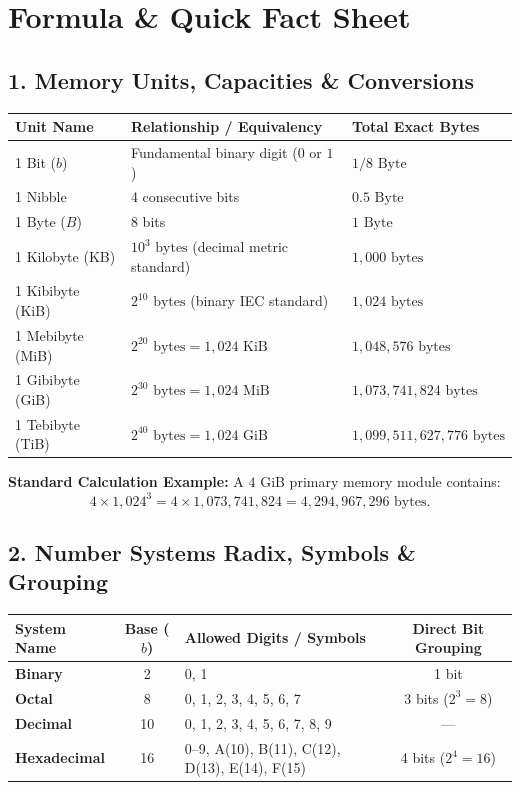 \chapter*{Formula \& Quick Fact Sheet}
\label{chap:formula_sheet}

\section*{1. Memory Units, Capacities \& Conversions}
\begin{center}
\renewcommand{\arraystretch}{1.25}
\begin{tabular}{l l l}
\toprule
\textbf{Unit Name} & \textbf{Relationship / Equivalency} & \textbf{Total Exact Bytes} \\
\midrule
1 Bit ($b$) & Fundamental binary digit ($0$ or $1$) & $1/8\text{ Byte}$ \\
1 Nibble & 4 consecutive bits & $0.5\text{ Byte}$ \\
1 Byte ($B$) & 8 bits & $1\text{ Byte}$ \\
1 Kilobyte (KB) & $10^3\text{ bytes}$ (decimal metric standard) & $1,000\text{ bytes}$ \\
1 Kibibyte (KiB) & $2^{10}\text{ bytes}$ (binary IEC standard) & $1,024\text{ bytes}$ \\
1 Mebibyte (MiB) & $2^{20}\text{ bytes} = 1,024\text{ KiB}$ & $1,048,576\text{ bytes}$ \\
1 Gibibyte (GiB) & $2^{30}\text{ bytes} = 1,024\text{ MiB}$ & $1,073,741,824\text{ bytes}$ \\
1 Tebibyte (TiB) & $2^{40}\text{ bytes} = 1,024\text{ GiB}$ & $1,099,511,627,776\text{ bytes}$ \\
\bottomrule
\end{tabular}
\end{center}

\vspace{2mm}
\noindent
\textbf{Standard Calculation Example:} A $4\text{ GiB}$ primary memory module contains:
\[
4 \times 1,024^3 = 4 \times 1,073,741,824 = 4,294,967,296\text{ bytes}.
\]

\section*{2. Number Systems Radix, Symbols \& Grouping}
\begin{center}
\renewcommand{\arraystretch}{1.25}
\begin{tabular}{l c l c}
\toprule
\textbf{System Name} & \textbf{Base ($b$)} & \textbf{Allowed Digits / Symbols} & \textbf{Direct Bit Grouping} \\
\midrule
\textbf{Binary} & 2 & 0, 1 & 1 bit \\
\textbf{Octal} & 8 & 0, 1, 2, 3, 4, 5, 6, 7 & 3 bits ($2^3 = 8$) \\
\textbf{Decimal} & 10 & 0, 1, 2, 3, 4, 5, 6, 7, 8, 9 & --- \\
\textbf{Hexadecimal} & 16 & 0--9, A(10), B(11), C(12), D(13), E(14), F(15) & 4 bits ($2^4 = 16$) \\
\bottomrule
\end{tabular}
\end{center}

